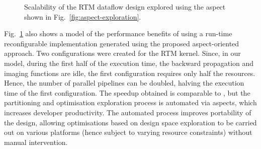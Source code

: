 \begin{figure}[!h]
  \centering
  \caption{Scalability of the RTM dataflow design explored using the aspect
shown in Fig.~\ref{fig:aspect-exploration}.}
  \label{fig:scalability}
\end{figure}



Fig.~\ref{fig:scalability} also shows a model of the performance
benefits of using a run-time reconfigurable implementation generated
using the proposed aspect-oriented approach. Two configurations were
created for the RTM \FAST{} kernel. Since, in our model, during the
first half of the execution time, the backward propagation and imaging
functions are idle, the first configuration requires only half the
resources. Hence, the number of parallel pipelines can be doubled,
halving the execution time of the first configuration. The speedup
obtained is comparable to \cite{Xinyu:Qiwei:Luk:Qiang:Pell:2012}, but
the partitioning and optimisation exploration process is automated via
aspects, which increases developer productivity. The automated process
improves portability of the design, allowing optimisations based on
design space exploration to be carried out on various platforms (hence
subject to varying resource constraints) without manual intervention.


